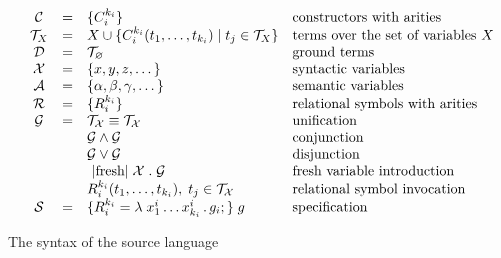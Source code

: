 \begin{figure*}[t]
\[
\begin{array}{cccll}
  &\mathcal{C} & = & \{C_i^{k_i}\} & \mbox{constructors with arities} \\
  &\mathcal{T}_X & = & X \cup \{C_i^{k_i} (t_1, \dots, t_{k_i}) \mid t_j\in\mathcal{T}_X\} & \mbox{terms over the set of variables $X$} \\
  &\mathcal{D} & = & \mathcal{T}_\emptyset & \mbox{ground terms}\\
  &\mathcal{X} & = & \{ x, y, z, \dots \} & \mbox{syntactic variables} \\
  &\mathcal{A} & = & \{ \alpha, \beta, \gamma, \dots \} & \mbox{semantic variables} \\
  &\mathcal{R} & = & \{ R_i^{k_i}\} &\mbox{relational symbols with arities} \\
  &\mathcal{G} & = & \mathcal{T_X}\equiv\mathcal{T_X}   &  \mbox{unification} \\
  &            &   & \mathcal{G}\wedge\mathcal{G}     & \mbox{conjunction} \\
  &            &   & \mathcal{G}\vee\mathcal{G}       &\mbox{disjunction} \\
  &            &   & \mbox{\lstinline|fresh|}\;\mathcal{X}\;.\;\mathcal{G} & \mbox{fresh variable introduction} \\
  &            &   & R_i^{k_i} (t_1,\dots,t_{k_i}),\;t_j\in\mathcal{T_X} & \mbox{relational symbol invocation} \\
  &\mathcal{S} & = & \{R_i^{k_i} = \lambda\;x_1^i\dots x_{k_i}^i\,.\, g_i;\}\; g & \mbox{specification}
\end{array}
\]
\caption{The syntax of the source language}
\label{syntax}
\end{figure*}

\begin{comment}
\begin{figure}[t]
\[
\begin{array}{rcl}
  \mathcal{FV}\,(x)&=&\{x\}\\
  \mathcal{FV}\,(C_i^{k_i}\,(t_1,\dots,t_{k_i}))&=&\bigcup\mathcal{FV}\,(t_i)\\
  \mathcal{FV}\,(t_1\equiv t_2)&=&\mathcal{FV}\,(t_1)\cup\mathcal{FV}\,(t_2)\\
  \mathcal{FV}\,(g_1\wedge g_2)&=&\mathcal{FV}\,(g_1)\cup\mathcal{FV}\,(g_2)\\
  \mathcal{FV}\,(g_1\vee g_2)&=&\mathcal{FV}\,(g_1)\cup\mathcal{FV}\,(g_2)\\
  \mathcal{FV}\,(\mbox{\lstinline|fresh|}\;x\;.\;g)&=&\mathcal{FV}\,(g)\setminus\{x\}\\
  \mathcal{FV}\,(R_i^{k_i}\,(t_1,\dots,t_{k_i}))&=&\bigcup\mathcal{FV}\,(t_i)
\end{array}
\]
\caption{Free variables in terms and goals}
\label{free}
\end{figure}
\end{comment}

